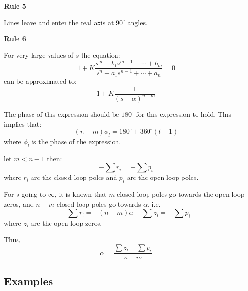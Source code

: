 \textbf{Rule 5}

Lines leave and enter the real axis at $90^\circ$ angles.

\textbf{Rule 6}

For very large values of $s$ the equation:
$$1+K\frac{s^m+b_1s^{m-1}+\cdots+b_m}{s^n+a_1s^{n-1}+\cdots+a_n} = 0$$
can be approximated to:
$$1+K\frac{1}{(s-\alpha)^{n-m}}$$

The phase of this expression should be $180^\circ$ for this expression to hold.
This implies that:
$$(n-m)\phi_l = 180^\circ+360^\circ(l-1)$$
where $\phi_l$ is the phase of the expression.

let $m<n-1$ then:
$$-\sum r_i = -\sum p_i$$
where $r_i$ are the closed-loop poles and $p_i$ are the open-loop poles.

For $s$ going to $\infty$, it is known that $m$ closed-loop poles go towards the open-loop zeros,
and $n-m$ closed-loop poles go towards $\alpha$, i.e.
$$-\sum r_i = -(n-m)\alpha - \sum z_i = -\sum p_i$$
where $z_i$ are the open-loop zeros.

Thus,
$$\alpha = \frac{\sum z_i - \sum p_i}{n-m}$$

\subsection{Examples}
